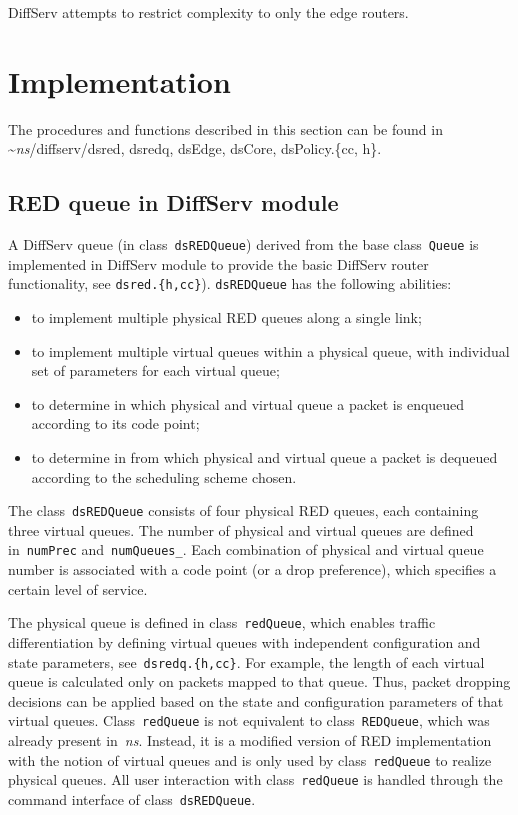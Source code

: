 DiffServ attempts to restrict complexity to only the edge routers.


\section{Implementation}
\label{sec:diffservimplement}

The procedures and functions described in this section can be found in
\textasciitilde\emph{ns}/{diffserv/dsred, dsredq, dsEdge, dsCore, dsPolicy.\{cc, h\}}.

\subsection{RED queue in DiffServ module}
\label{sec:dsredq}

A DiffServ queue (in class~{\tt dsREDQueue}) derived from 
  the base class~{\tt Queue} is implemented in DiffServ module to 
  provide the basic DiffServ router functionality, 
  see {\tt dsred.\{h,cc\}}).
{\tt dsREDQueue} has the following abilities:

\begin{itemize}
\item
to implement multiple physical RED queues along a single link;
\item
to implement multiple virtual queues within a physical queue, 
  with individual set of parameters for each virtual queue;
\item
to determine in which physical and virtual queue a packet is enqueued 
  according to its code point;
\item
to determine in from which physical and virtual queue a packet is dequeued 
  according to the scheduling scheme chosen.
\end{itemize}

The class~{\tt dsREDQueue} consists of four physical RED queues,
  each containing three virtual queues.
The number of physical and virtual queues are 
  defined in~{\tt numPrec} and~{\tt numQueues\_}.
Each combination of physical and virtual queue number is associated with 
  a code point (or a drop preference), 
  which specifies a certain level of service.

The physical queue is defined in class~{\tt redQueue}, 
  which enables traffic differentiation by defining virtual queues with
  independent configuration and state parameters,
  see~{\tt dsredq.\{h,cc\}}. 
For example, 
  the length of each virtual queue is calculated only on packets mapped to 
  that queue.  
Thus, packet dropping decisions can be applied based on 
  the state and configuration parameters of that virtual queues.
Class~{\tt redQueue} is not equivalent to class~{\tt REDQueue},
  which was already present in~\emph{ns}.  
Instead, it is a modified version of RED implementation with 
  the notion of virtual queues and 
  is only used by class~{\tt redQueue} to realize physical queues.
All user interaction with class~{\tt redQueue} 
  is handled through the command interface of class~{\tt dsREDQueue}.

